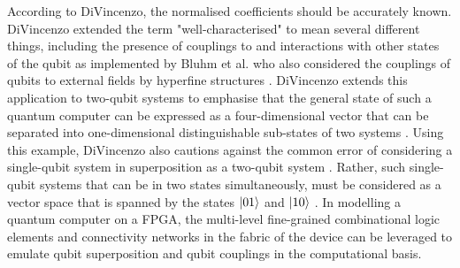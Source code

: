 According to DiVincenzo, the normalised coefficients should be accurately known. DiVincenzo extended the term "well-characterised" to mean several different things, including the presence of couplings to and interactions with other states of the qubit as implemented by Bluhm et al. who also considered the couplings of qubits to external fields by \gls{hyperfine structure}s \cite{divincenzo2000physical, bluhm2011dephasing}. DiVincenzo extends this application to two-qubit systems to emphasise that the general state of such a quantum computer can be expressed as a four-dimensional vector that can be separated into one-dimensional distinguishable sub-states of two systems \cite{divincenzo2000physical}. Using this example, DiVincenzo also cautions against the common error of considering a single-qubit system in superposition as a two-qubit system \cite{divincenzo2000physical}. Rather, such single-qubit systems that can be in two states simultaneously, must be considered as a vector space that is spanned by the states $\ket{01}$ and $\ket{10}$ \cite{divincenzo2000physical}. In modelling a quantum computer on a FPGA, the multi-level \gls{fine-grained} combinational logic elements and connectivity networks in the fabric of the device can be leveraged to emulate qubit superposition and qubit couplings in the computational basis. 

